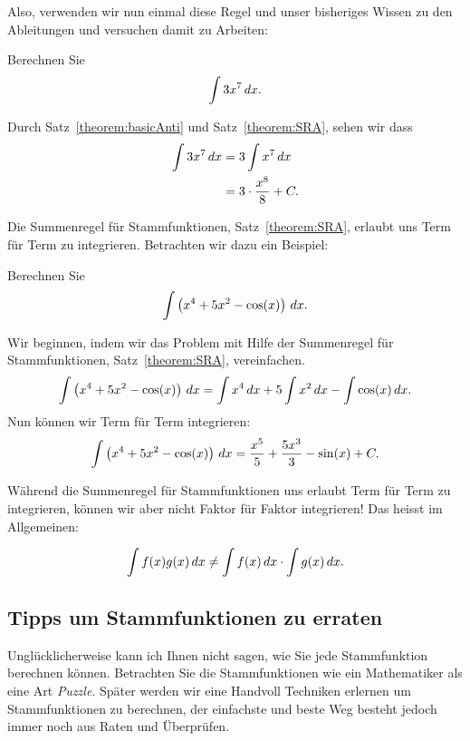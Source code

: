 Also, verwenden wir nun einmal diese Regel und unser bisheriges Wissen zu den Ableitungen und versuchen damit zu Arbeiten:

\begin{example}
Berechnen Sie
\[
\int 3 x^7 \, d x.
\]
\end{example}

\begin{solution}
Durch Satz~\ref{theorem:basicAnti} und Satz~\ref{theorem:SRA}, sehen wir dass
\begin{align*}
\int 3 x^7 \, d x &= 3 \int x^7 \, d x\\
&= 3 \cdot \frac{x^8}{8}+C.
\end{align*}
\end{solution}

Die Summenregel für Stammfunktionen, Satz~\ref{theorem:SRA}, erlaubt uns Term für Term zu integrieren. Betrachten wir dazu ein Beispiel:

\begin{example}
Berechnen Sie
\[
\int \left(x^4 + 5x^2 - \cos(x)\right) \, d x.
\]
\end{example}

\begin{solution} 
Wir beginnen, indem wir das Problem mit Hilfe der Summenregel für Stammfunktionen, Satz~\ref{theorem:SRA}, vereinfachen.
\[
\int \left(x^4 + 5x^2 - \cos(x)\right) \, d x = \int x^4 \, d x + 5\int x^2 \, d x - \int \cos(x) \, d x.
\]
Nun können wir Term für Term integrieren:
\[
\int \left(x^4 + 5x^2 - \cos(x)\right) \, d x = \frac{x^5}{5} + \frac{5x^3}{3}  - \sin(x)+C.
\]
\end{solution}


\begin{warning}
Während die Summenregel für Stammfunktionen uns erlaubt Term für Term zu integrieren, können wir aber nicht Faktor für Faktor integrieren! Das heisst im Allgemeinen:

\[
\int f(x)g(x) \, d x \ne \int f(x) \, d x\cdot \int g(x) \, d x.
\]
\end{warning}








\subsection*{Tipps um Stammfunktionen zu erraten}

Unglücklicherweise kann ich Ihnen nicht sagen, wie Sie jede Stammfunktion berechnen können. Betrachten Sie die Stammfunktionen wie ein Mathematiker als eine Art \textit{Puzzle}. Später werden wir eine Handvoll Techniken erlernen um Stammfunktionen zu berechnen, der einfachste und beste Weg besteht jedoch immer noch aus Raten und Überprüfen.



